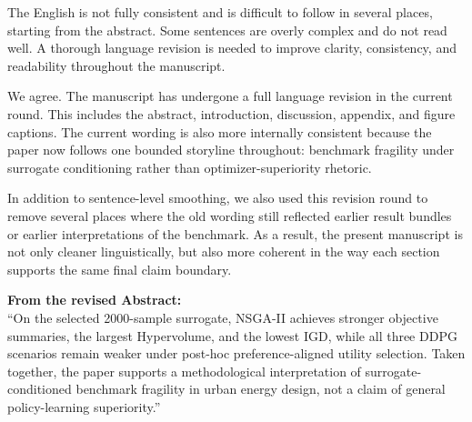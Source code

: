 \begin{ReviewerComment}
The English is not fully consistent and is difficult to follow in several places, starting from the abstract. Some sentences are overly complex and do not read well. A thorough language revision is needed to improve clarity, consistency, and readability throughout the manuscript.
\end{ReviewerComment}
%
\begin{Answer}
We agree. The manuscript has undergone a full language revision in the current round. This includes the abstract, introduction, discussion, appendix, and figure captions. The current wording is also more internally consistent because the paper now follows one bounded storyline throughout: benchmark fragility under surrogate conditioning rather than optimizer-superiority rhetoric.

In addition to sentence-level smoothing, we also used this revision round to remove several places where the old wording still reflected earlier result bundles or earlier interpretations of the benchmark. As a result, the present manuscript is not only cleaner linguistically, but also more coherent in the way each section supports the same final claim boundary.
\end{Answer}
\begin{RevisionExcerpt}
\noindent\textbf{From the revised Abstract:}\\
``On the selected 2000-sample surrogate, NSGA-II achieves stronger objective summaries, the largest Hypervolume, and the lowest IGD, while all three DDPG scenarios remain weaker under post-hoc preference-aligned utility selection. Taken together, the paper supports a methodological interpretation of surrogate-conditioned benchmark fragility in urban energy design, not a claim of general policy-learning superiority.''
\end{RevisionExcerpt}


